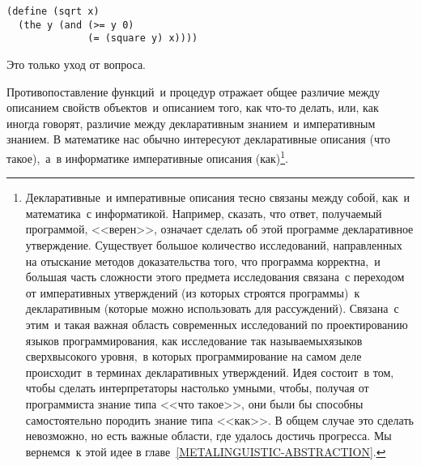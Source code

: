 \begin{Verbatim}[fontsize=\small]
(define (sqrt x)
  (the y (and (>= y 0)
              (= (square y) x))))
\end{Verbatim}
Это только уход от вопроса.

Противопоставление функций~и процедур отражает общее
различие между описанием свойств объектов~и описанием того, как что-то
делать, или, как иногда говорят,
различие между декларативным
знанием~и императивным знанием.  
В математике нас обычно интересуют 
декларативные описания (что такое),~а~в информатике императивные
описания (как)\footnote{Декларативные~и императивные описания тесно связаны
между собой, как~и математика~с информатикой.  Например, сказать, что
ответ, получаемый программой, <<верен>>, означает сделать об этой
программе декларативное утверждение.  Существует большое количество
исследований, направленных на отыскание методов 
доказательства того, что
программа корректна,~и большая часть сложности этого
предмета
исследования связана~с переходом от императивных утверждений (из
которых строятся программы)~к декларативным (которые можно
использовать для рассуждений).  Связана~с этим~и такая важная область
современных исследований по проектированию языков программирования,
как исследование так называемыхязыков сверхвысокого уровня,~в которых  
программирование на самом деле происходит~в терминах декларативных
утверждений.  Идея состоит~в том, чтобы сделать интерпретаторы
настолько умными, чтобы, получая от программиста знание типа <<что
такое>>, они были бы способны самостоятельно породить знание типа
<<как>>. В общем случае это сделать невозможно, но есть важные
области, где удалось достичь прогресса. Мы вернемся~к этой идее в
главе~\ref{METALINGUISTIC-ABSTRACTION}.}.

